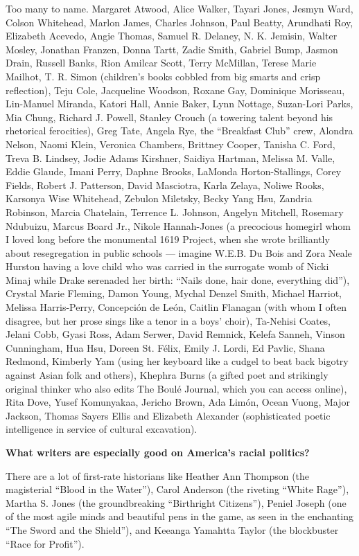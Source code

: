 Too many to name. Margaret Atwood, Alice Walker, Tayari Jones, Jesmyn
Ward, Colson Whitehead, Marlon James, Charles Johnson, Paul Beatty,
Arundhati Roy, Elizabeth Acevedo, Angie Thomas, Samuel R. Delaney, N. K.
Jemisin, Walter Mosley, Jonathan Franzen, Donna Tartt, Zadie Smith,
Gabriel Bump, Jasmon Drain, Russell Banks, Rion Amilcar Scott, Terry
McMillan, Terese Marie Mailhot, T. R. Simon (children's books cobbled
from big smarts and crisp reflection), Teju Cole, Jacqueline Woodson,
Roxane Gay, Dominique Morisseau, Lin-Manuel Miranda, Katori Hall, Annie
Baker, Lynn Nottage, Suzan-Lori Parks, Mia Chung, Richard J. Powell,
Stanley Crouch (a towering talent beyond his rhetorical ferocities),
Greg Tate, Angela Rye, the ``Breakfast Club'' crew, Alondra Nelson,
Naomi Klein, Veronica Chambers, Brittney Cooper, Tanisha C. Ford, Treva
B. Lindsey, Jodie Adams Kirshner, Saidiya Hartman, Melissa M. Valle,
Eddie Glaude, Imani Perry, Daphne Brooks, LaMonda Horton-Stallings,
Corey Fields, Robert J. Patterson, David Masciotra, Karla Zelaya, Noliwe
Rooks, Karsonya Wise Whitehead, Zebulon Miletsky, Becky Yang Hsu,
Zandria Robinson, Marcia Chatelain, Terrence L. Johnson, Angelyn
Mitchell, Rosemary Ndubuizu, Marcus Board Jr., Nikole Hannah-Jones (a
precocious homegirl whom I loved long before the monumental 1619
Project, when she wrote brilliantly about resegregation in public
schools --- imagine W.E.B. Du Bois and Zora Neale Hurston having a love
child who was carried in the surrogate womb of Nicki Minaj while Drake
serenaded her birth: ``Nails done, hair done, everything did''), Crystal
Marie Fleming, Damon Young, Mychal Denzel Smith, Michael Harriot,
Melissa Harris-Perry, Concepción de León, Caitlin Flanagan (with whom I
often disagree, but her prose sings like a tenor in a boys' choir),
Ta-Nehisi Coates, Jelani Cobb, Gyasi Ross, Adam Serwer, David Remnick,
Kelefa Sanneh, Vinson Cunningham, Hua Hsu, Doreen St. Félix, Emily J.
Lordi, Ed Pavlic, Shana Redmond, Kimberly Yam (using her keyboard like a
cudgel to beat back bigotry against Asian folk and others), Khephra
Burns (a gifted poet and strikingly original thinker who also edits The
Boulé Journal, which you can access online), Rita Dove, Yusef
Komunyakaa, Jericho Brown, Ada Limón, Ocean Vuong, Major Jackson, Thomas
Sayers Ellis and Elizabeth Alexander (sophisticated poetic intelligence
in service of cultural excavation).

\textbf{What writers are especially good on America's racial politics?}

There are a lot of first-rate historians like Heather Ann Thompson (the
magisterial ``Blood in the Water''), Carol Anderson (the riveting
``White Rage''), Martha S. Jones (the groundbreaking ``Birthright
Citizens''), Peniel Joseph (one of the most agile minds and beautiful
pens in the game, as seen in the enchanting ``The Sword and the
Shield''), and Keeanga Yamahtta Taylor (the blockbuster ``Race for
Profit'').

